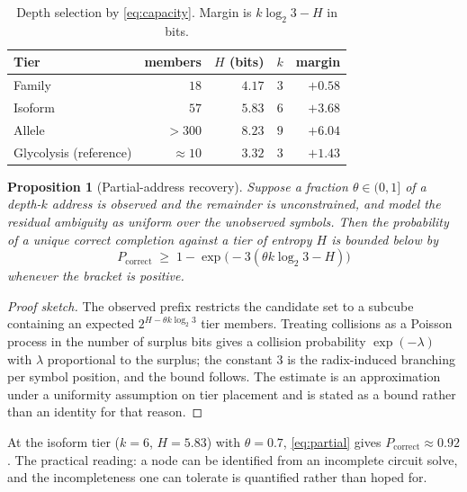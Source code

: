 \documentclass[11pt,twocolumn,a4paper]{article}
\theoremstyle{plain}
\newtheorem{proposition}[theorem]{Proposition}
\theoremstyle{definition}
\theoremstyle{remark}
\begin{document}
\begin{table}[H]
\centering
\small
\caption{Depth selection by \cref{eq:capacity}. Margin is
$k\log_2 3 - H$ in bits.}
\label{tab:tiers}
\begin{tabular}{lrrrr}
\toprule
Tier & members & $H$ (bits) & $k$ & margin \\
\midrule
Family              & $18$   & $4.17$ & $3$ & $+0.58$ \\
Isoform             & $57$   & $5.83$ & $6$ & $+3.68$ \\
Allele              & $>300$ & $8.23$ & $9$ & $+6.04$ \\
\midrule
Glycolysis (reference) & $\approx 10$ & $3.32$ & $3$ & $+1.43$ \\
\bottomrule
\end{tabular}
\end{table}

\begin{proposition}[Partial-address recovery]
\label{prop:partial}
Suppose a fraction $\theta \in (0,1]$ of a depth-$k$ address is observed and the
remainder is unconstrained, and model the residual ambiguity as uniform over the
unobserved symbols. Then the probability of a unique correct completion against
a tier of entropy $H$ is bounded below by
\begin{equation}
P_{\mathrm{correct}} \;\ge\; 1 - \exp\bigl(-3(\theta k\log_2 3 - H)\bigr)
\label{eq:partial}
\end{equation}
whenever the bracket is positive.
\end{proposition}

\begin{proof}[Proof sketch]
The observed prefix restricts the candidate set to a subcube containing an
expected $2^{H - \theta k \log_2 3}$ tier members. Treating collisions as a
Poisson process in the number of surplus bits gives a collision probability
$\exp(-\lambda)$ with $\lambda$ proportional to the surplus; the constant $3$ is
the radix-induced branching per symbol position, and the bound follows.
The estimate is an approximation under a uniformity assumption on tier placement
and is stated as a bound rather than an identity for that reason.
\end{proof}

At the isoform tier ($k=6$, $H=5.83$) with $\theta = 0.7$, \cref{eq:partial}
gives $P_{\mathrm{correct}} \approx 0.92$. The practical reading: a node can be
identified from an incomplete circuit solve, and the incompleteness one can
tolerate is quantified rather than hoped for.
\end{document}
